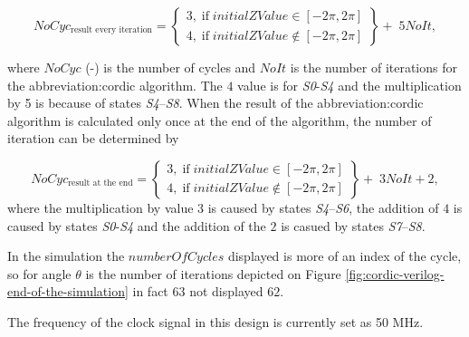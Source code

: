 \documentclass[a4paper, twoside, 11pt]{article}
\begin{document}
    \begin{equation}
                NoCyc_\text{result every iteration} = 
                \left\{
                \begin{array}{lr}
                    3,\;\text{if}\;initialZValue \in [-2 \pi, 2 \pi]\\
                    4,\;\text{if}\;initialZValue \notin [-2 \pi, 2 \pi]
                \end{array}
                \right\}
         + \;5 NoIt,
    \end{equation}

    where $NoCyc$ (-) is the number of cycles and $NoIt$ is the number of iterations for the \gls{abbreviation:cordic} algorithm. The $4$ value is for \textit{S0}-\textit{S4} and the multiplication by 5 is because of states \textit{S4}–\textit{S8}. When the result of the \gls{abbreviation:cordic} algorithm is calculated only once at the end of the algorithm, the number of iteration can be determined by

    \begin{equation}
        NoCyc_\text{result at the end} = 
                \left\{
                \begin{array}{lr}
                    3,\;\text{if}\;initialZValue \in [-2 \pi, 2 \pi]\\
                    4,\;\text{if}\;initialZValue \notin [-2 \pi, 2 \pi]
                \end{array}
                \right\}
            +\;3 NoIt + 2,
    \end{equation}
    where the multiplication by value 3 is caused by states \textit{S4}–\textit{S6}, the addition of $4$ is caused by states \textit{S0}-\textit{S4} and the addition of the $2$ is casued by states \textit{S7}–\textit{S8}.\par
    \par
    In the simulation the $numberOfCycles$ displayed is more of an index of the cycle, so for angle $\theta$ is the number of iterations depicted on Figure \ref{fig:cordic-verilog-end-of-the-simulation} in fact $63$ not displayed $62$.

    The frequency of the clock signal in this design is currently set as 50 MHz.
\end{document}
